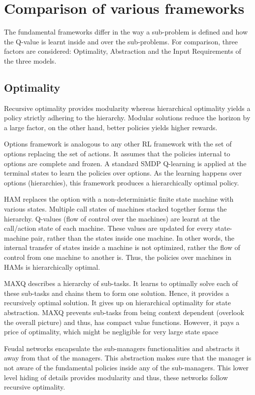 \section{Comparison of various frameworks}

The fundamental frameworks differ in the way a sub-problem is defined and how the Q-value is learnt inside and over the sub-problems. For comparison, three factors are considered: Optimality, Abstraction and the Input Requirements of the three models. 


\subsection{Optimality}

Recursive optimality provides modularity whereas hierarchical optimality yields a policy strictly adhering to  the hierarchy.  Modular solutions reduce the horizon by a large factor, on the other hand, better policies yields higher rewards. 

Options framework is analogous to any other RL framework with the set of options replacing the set of actions. It assumes that the policies internal to options are complete and frozen. A standard SMDP Q-learning is applied at the terminal states to learn the policies over options. As the learning happens over options (hierarchies), this framework produces a hierarchically optimal policy. 

HAM replaces the option with a non-deterministic finite state machine with various states. Multiple call states of machines stacked together forms the hierarchy. Q-values (flow of control over the machines) are learnt at the call/action state of each machine. These values are updated for every state-machine pair, rather than the states inside one machine. In other words, the internal transfer of states inside a machine is not optimized, rather the flow of control from one machine to another is. Thus, the policies over machines in HAMs is hierarchically optimal.  


MAXQ describes a hierarchy of sub-tasks. It learns to optimally solve each of these sub-tasks and chains them to form one solution. Hence, it provides a recursively optimal solution. It gives up on hierarchical optimality for state abstraction. MAXQ prevents sub-tasks from being context dependent (overlook the overall picture) and thus, has compact value functions. However, it pays a price of optimality, which might be negligible for very large state space

Feudal networks encapsulate the sub-managers functionalities and abstracts it away from that of the managers. This abstraction makes sure that the manager is not aware of the fundamental policies inside any of the sub-managers. This lower level hiding of details provides modularity and thus, these networks follow recursive optimality. 


